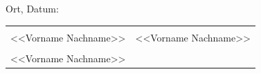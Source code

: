 \vspace{2cm}

\noindent
Ort, Datum: \underline{\hspace{6cm}}

\vspace{1.5cm}
\noindent
\begin{tabular}{p{6cm} p{6cm}}
  \underline{\hspace{5.5cm}} & \underline{\hspace{5.5cm}} \\[0.3cm]
  <<Vorname Nachname>>        & <<Vorname Nachname>>        \\[1.5cm]
  \underline{\hspace{5.5cm}} &                             \\[0.3cm]
  <<Vorname Nachname>>        &                             \\
\end{tabular}
